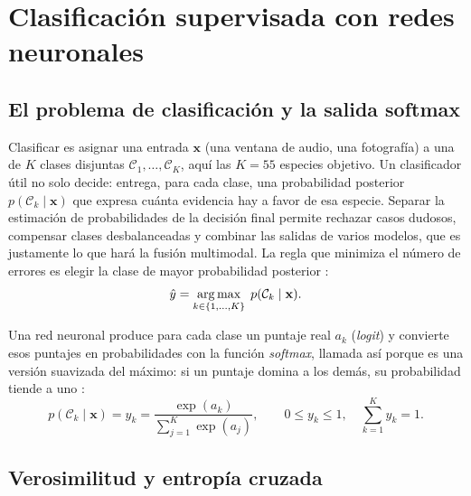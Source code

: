 \section{Clasificación supervisada con redes neuronales}\label{sec:teoria-redes}

\subsection{El problema de clasificación y la salida softmax}

Clasificar es asignar una entrada $\mathbf{x}$ (una ventana de audio, una
fotografía) a una de $K$ clases disjuntas $\mathcal{C}_1, \dots,
\mathcal{C}_K$, aquí las $K = 55$ especies objetivo. Un clasificador útil no
solo decide: entrega, para cada clase, una probabilidad posterior
$p(\mathcal{C}_k \mid \mathbf{x})$ que expresa cuánta evidencia hay a favor
de esa especie. Separar la estimación de probabilidades de la decisión
final permite rechazar casos dudosos, compensar clases desbalanceadas y
combinar las salidas de varios modelos, que es justamente lo que hará la
fusión multimodal. La regla que
minimiza el número de errores es elegir la clase de mayor probabilidad
posterior \citep[pp.~140--147]{bishop2024deep}:
\begin{equation}
  \hat{y} = \operatorname*{arg\,max}_{k \in \{1,\dots,K\}} \; p(\mathcal{C}_k \mid \mathbf{x}).
  \label{eq:argmax}
\end{equation}

Una red neuronal produce para cada clase un puntaje real $a_k$
(\textit{logit}) y convierte esos puntajes en probabilidades con la función
\textit{softmax}, llamada así porque es una versión suavizada del máximo: si
un puntaje domina a los demás, su probabilidad tiende a uno
\citep[p.~152]{bishop2024deep}:
\begin{equation}
  p(\mathcal{C}_k \mid \mathbf{x}) = y_k = \frac{\exp(a_k)}{\sum_{j=1}^{K} \exp(a_j)},
  \qquad 0 \le y_k \le 1, \quad \sum_{k=1}^{K} y_k = 1.
  \label{eq:softmax}
\end{equation}

\subsection{Verosimilitud y entropía cruzada}

